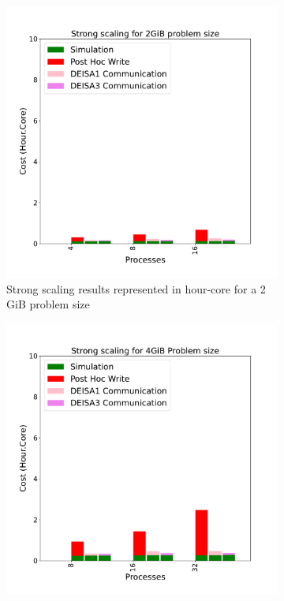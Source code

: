 \begin{figure}[hb]
     \centering
     \begin{subfigure}[b]{0.4\textwidth}
         \centering
         \includegraphics[width=\textwidth, height=\textwidth]{figures/D2_1vs3vspost1vspost2.pdf}
         \caption{Strong scaling results represented in hour-core for a 2\,GiB problem size}
         \label{fig:D2}
     \end{subfigure}
     \hfill
     \begin{subfigure}[b]{0.4\textwidth}
         \centering
         \includegraphics[width=\textwidth, height=\textwidth]{figures/D4_1vs3vspost1vspost2.pdf}

\end{subfigure}
\end{figure}
